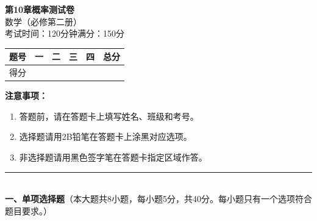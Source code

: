 \documentclass[12pt, a4paper]{ctexart}
\begin{document}
\begin{center}
{\Large\bfseries 第10章\quad 概率\quad 测试卷}\\[6pt]
{\normalsize 数学（必修第二册）}\\[4pt]
{\small 考试时间：120分钟\quad 满分：150分}
\end{center}

\vspace{2pt}
\begin{center}
\begin{tabular}{|c|c|c|c|c|}
\hline
题号 & 一 & 二 & 三 & 四 & 总分 \\ \hline
得分 & & & & & \\ \hline
\end{tabular}
\end{center}
\vspace{4pt}

\noindent\textbf{注意事项：}
\begin{enumerate}[leftmargin=2em]
  \item 答题前，请在答题卡上填写姓名、班级和考号。
  \item 选择题请用2B铅笔在答题卡上涂黑对应选项。
  \item 非选择题请用黑色签字笔在答题卡指定区域作答。
\end{enumerate}

\vspace{6pt}

\noindent\rule{\textwidth}{0.4pt}\\[2pt]
{\large\bfseries 一、单项选择题}（本大题共8小题，每小题5分，共40分。每小题只有一个选项符合题目要求。）

\vspace{6pt}
\end{document}
